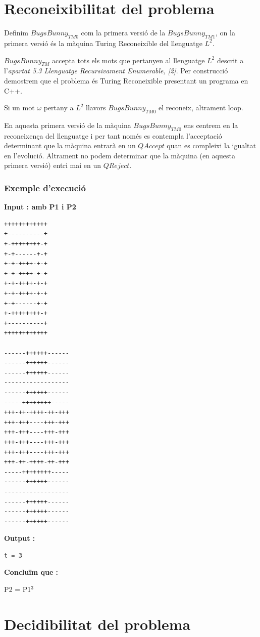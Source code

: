 \documentclass[12pt,a4paper]{report}
\def \w{$\omega$}
\def \tm{$BugsBunny_{TM} $}
\def \tmz{$BugsBunny_{TM0} $}
\def \tmu{$BugsBunny_{TM1} $}
\def \ld{$L^{2}$}
\begin{document}
\section{Reconeixibilitat del problema}

Definim \tmz{} com la primera versió de la \tmu{}, on la primera versió és la màquina Turing Reconeixible del llenguatge \ld{}.

\tm{} accepta tots els mots que pertanyen al llenguatge \ld{} descrit a l’\textit{apartat 5.3 Llenguatge Recursivament Enumerable, [2]}. Per construcció demostrem que el problema és Turing Reconeixible presentant un programa en C++.

Si un mot \w{} pertany a \ld{} llavors \tmz{} el reconeix, altrament loop.

En aquesta primera versió de la màquina \tmz{} ens centrem en la reconeixença del llenguatge i per tant només es contempla l’acceptació determinant que la màquina entrarà en un $QAccept$ quan es compleixi la igualtat en l’evolució. Altrament no podem determinar que la màquina (en aquesta primera versió) entri mai en un $QReject$.

\subsubsection{Exemple d'execució}

\textbf{Input : amb P1 i P2}

\begin{lstlisting}
++++++++++++
+----------+
+-++++++++-+
+-+------+-+
+-+-++++-+-+
+-+-++++-+-+
+-+-++++-+-+
+-+-++++-+-+
+-+------+-+
+-++++++++-+
+----------+
++++++++++++

------++++++------
------++++++------
------++++++------
------------------
------++++++------
-----++++++++-----
+++-++-++++-++-+++
+++-+++----+++-+++
+++-+++----+++-+++
+++-+++----+++-+++
+++-+++----+++-+++
+++-++-++++-++-+++
-----++++++++-----
------++++++------
------------------
------++++++------
------++++++------
------++++++------

\end{lstlisting}

\textbf{Output :}

\begin{lstlisting}
t = 3
\end{lstlisting}

\textbf{Concluïm que :}

P2 = P1$^3$


\section{Decidibilitat del problema}
\end{document}
